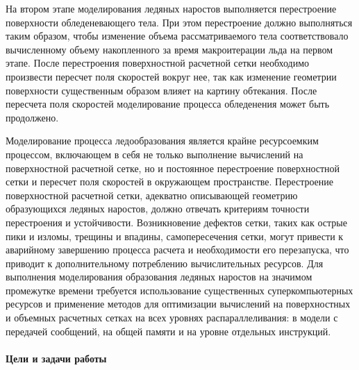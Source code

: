 
На втором этапе моделирования ледяных наростов выполняется перестроение поверхности обледеневающего тела.
При этом перестроение должно выполняться таким образом, чтобы изменение объема рассматриваемого тела соответствовало вычисленному объему накопленного за время макроитерации льда на первом этапе.
После перестроения поверхностной расчетной сетки необходимо произвести пересчет поля скоростей вокруг нее, так как изменение геометрии поверхности существенным образом влияет на картину обтекания.
После пересчета поля скоростей моделирование процесса обледенения может быть продолжено.

Моделирование процесса ледообразования является крайне ресурсоемким процессом, включающем в себя не только выполнение вычислений на поверхностной расчетной сетке, но и постоянное перестроение поверхностной сетки и пересчет поля скоростей в окружающем пространстве.
Перестроение поверхностной расчетной сетки, адекватно описывающей геометрию образующихся ледяных наростов, должно отвечать критериям точности перестроения и устойчивости.
Возникновение дефектов сетки, таких как острые пики и изломы, трещины и впадины, самопересечения сетки, могут привести к аварийному завершению процесса расчета и необходимости его перезапуска, что приводит к дополнительному потреблению вычислительных ресурсов. 
Для выполнения моделирования образования ледяных наростов на значимом промежутке времени требуется использование существенных суперкомпьютерных ресурсов и применение методов для оптимизации вычислений на поверхностных и объемных расчетных сетках на всех уровнях распараллеливания: в модели с передачей сообщений, на общей памяти и на уровне отдельных инструкций.

\paragraph{Цели и задачи работы} \

